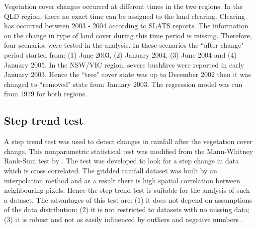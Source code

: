\documentclass[draft,linenumbers]{agujournal}
\begin{document}
\begin{article}

Vegetation cover changes occurred at different times in the two regions. In the QLD region, there no exact time can be assigned to the land clearing. Clearing has occurred between 2003 - 2004 according to SLATS reports. The information on the change in type of land cover during this time period is missing. Therefore, four scenarios were tested in the analysis. In these scenarios the ``after change" period started from: (1) June 2003, (2) January 2004, (3) June 2004 and (4) January 2005. In the NSW/VIC region, severe bushfires were reported in early January 2003. Hence the ``tree" cover state was up to December 2002 then it was changed to ``removed" state from January 2003. The regression model was run from 1979 for both regions.


 


\subsection{Step trend test}

A step trend test was used to detect changes in rainfall after the vegetation cover change. This nonparametric statistical test was modified from the Mann-Whitney Rank-Sum test by \citet{Hirsch1985}. The test was developed to look for a step change in data which is cross correlated. The gridded rainfall dataset was built by an interpolation method and as a result there is high spatial correlation between neighbouring pixels. Hence the step trend test is suitable for the analysis of such a dataset. The advantages of this test are: (1) it does not depend on assumptions of the data distribution; (2) it is not restricted to datasets with no missing data; (3) it is robust and not as easily influenced by outliers and negative numbers \citep{Hirsch1985}.


\end{article}
\end{document}
